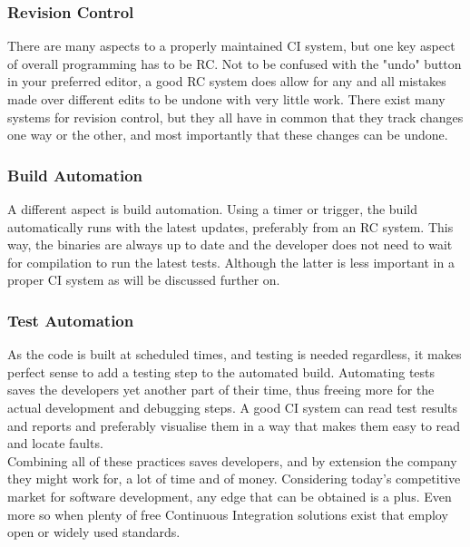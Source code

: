 \documentclass[11pt,british]{article}
\begin{document}
\subsubsection{Revision Control}
There are many aspects to a properly maintained \gls{CI} system, but one key aspect of overall programming has to be \gls{RC}. Not to be confused with the "undo" button in your preferred editor, a good \gls{RC} system does allow for any and all mistakes made over different edits to be undone with very little work. There exist many systems for revision control, but they all have in common that they track changes one way or the other, and most importantly that these changes can be undone. 

\subsubsection{Build Automation}
A different aspect is build automation. Using a timer or trigger, the build automatically runs with the latest updates, preferably from an \gls{RC} system. This way, the binaries are always up to date and the developer does not need to wait for compilation to run the latest tests. Although the latter is less important in a proper \gls{CI} system as will be discussed further on. 

\subsubsection{Test Automation}
As the code is built at scheduled times, and testing is needed regardless, it makes perfect sense to add a testing step to the automated build. Automating tests saves the developers yet another part of their time, thus freeing more for the actual development and debugging steps. A good \gls{CI} system can read test results and reports and preferably visualise them in a way that makes them easy to read and locate faults.
\\[\baselineskip]
Combining all of these practices saves developers, and by extension the company they might work for, a lot of time and of money. Considering today's competitive market for software development, any edge that can be obtained is a plus. Even more so when plenty of free Continuous Integration solutions exist that employ open or widely used standards.\cite{ci1,ci2,ci3}
\end{document}
